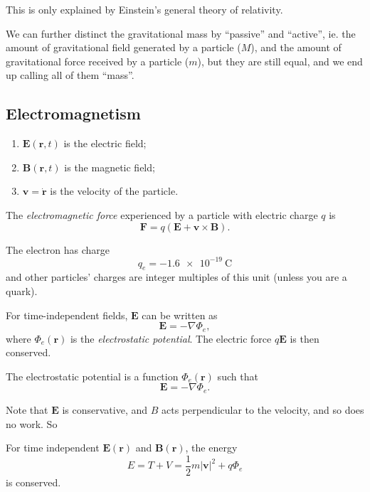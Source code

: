 \documentclass[a4paper]{article}
\begin{document}
This is only explained by Einstein's general theory of relativity.

We can further distinct the gravitational mass by ``passive'' and ``active'', ie. the amount of gravitational field generated by a particle ($M$), and the amount of gravitational force received by a particle ($m$), but they are still equal, and we end up calling all of them ``mass''.

\subsection{Electromagnetism}
\begin{notation}\leavevmode
   \begin{enumerate}
    \item $\mathbf{E}(\mathbf{r}, t)$ is the electric field;
    \item $\mathbf{B}(\mathbf{r}, t)$ is the magnetic field;
    \item $\mathbf{v} = \dot{\mathbf{r}}$ is the velocity of the particle.
  \end{enumerate}
\end{notation}
\begin{law}
  The \emph{electromagnetic force} experienced by a particle with electric charge $q$ is
  \[
    \mathbf{F} = q(\mathbf{E} + \mathbf{v}\times \mathbf{B}).
  \]
\end{law}

\begin{law}
  The electron has charge
  \[
    q_e = \SI{-1.6e-19}{\coulomb}
  \]
  and other particles' charges are integer multiples of this unit (unless you are a quark).
\end{law}

\begin{law}
  For time-independent fields, $\mathbf{E}$ can be written as
  \[
    \mathbf{E} = -\nabla \Phi_e,
  \]
  where $\Phi_e(\mathbf{r})$ is the \emph{electrostatic potential}.
  The electric force $q\mathbf{E}$ is then conserved.
\end{law}
\begin{defi}
  The electrostatic potential is a function $\Phi_e(\mathbf{r})$ such that
  \[
    \mathbf{E} = -\nabla \Phi_e.
  \]
\end{defi}

Note that $\mathbf{E}$ is conservative, and $B$ acts perpendicular to the velocity, and so does no work. So
\begin{prop}
  For time independent $\mathbf{E}(\mathbf{r})$ and $\mathbf{B}(\mathbf{r})$, the energy
  \[
    E = T + V = \frac{1}{2}m|\mathbf{v}|^2 + q\Phi_e
  \]
  is conserved.
\end{prop}
\end{document}
